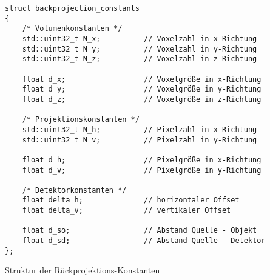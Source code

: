 \begin{code}
\begin{verbatim}
struct backprojection_constants
{
    /* Volumenkonstanten */
    std::uint32_t N_x;          // Voxelzahl in x-Richtung
    std::uint32_t N_y;          // Voxelzahl in y-Richtung
    std::uint32_t N_z;          // Voxelzahl in z-Richtung

    float d_x;                  // Voxelgröße in x-Richtung
    float d_y;                  // Voxelgröße in y-Richtung
    float d_z;                  // Voxelgröße in z-Richtung

    /* Projektionskonstanten */
    std::uint32_t N_h;          // Pixelzahl in x-Richtung
    std::uint32_t N_v;          // Pixelzahl in y-Richtung

    float d_h;                  // Pixelgröße in x-Richtung
    float d_v;                  // Pixelgröße in y-Richtung

    /* Detektorkonstanten */
    float delta_h;              // horizontaler Offset
    float delta_v;              // vertikaler Offset

    float d_so;                 // Abstand Quelle - Objekt
    float d_sd;                 // Abstand Quelle - Detektor
};
\end{verbatim}
\caption{Struktur der Rückprojektions-Konstanten}
\label{app:fdk_consts}
\end{code}

